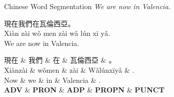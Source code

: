 \documentclass[10pt, compress, aspectratio=169]{beamer}
\newcommand{\upos}[1]{\textbf{\color{blue}#1}}
\newcommand{\zh}[1]{{\jafont #1}}
\begin{document}
\begin{frame}{Chinese Word Segmentation}
\textit{We are now in Valencia.}

\begin{dependency}[label style={thick, font=\bfseries}]
\begin{deptext}[font=\bfseries]
\zh{現在我們在瓦倫西亞。} \\
Xiàn zài wǒ men zài wǎ lún xī yǎ. \\
We are now in Valencia. \\
\end{deptext}
\end{dependency}

\begin{dependency}[label style={thick, font=\bfseries}]
\begin{deptext}[font=\bfseries]
\zh{現在} \& \zh{我們} \& \zh{在} \& \zh{瓦倫西亞} \& \zh{。} \\
Xiànzài \& wǒmen \& zài \& Wǎlúnxīyǎ \& . \\
Now \& we \& in \& Valencia \& . \\
\upos{ADV} \& \upos{PRON} \& \upos{ADP} \& \upos{PROPN} \& \upos{PUNCT} \\
\end{deptext}
\end{dependency}
\end{frame}
\end{document}
